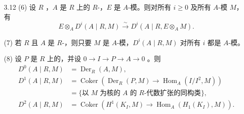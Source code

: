 \begin{SGAresult}{}{3.12}
(6) 设 $R$ ，$A$ 是 $R$ 上的 $R$-，$E$ 是 $A$-模。则对所有 $i\geq0$ 及所有 $A$-模 $M$，有
\[E\otimes_A D^i(A\mid R,M)\xrightarrow{\sim}D^i(A\mid R,E\otimes_A M).\]

(7) 若 $R$ 且 $A$ 是 $R$-，则只要 $M$ 是 $A$-模，$D^i(A\mid R,M)$ 对所有 $i$ 都是 $A$-模。

(8) 设 $P$ 是 $R$ 上的，并设 $0\to I\to P\to A\to0$ 。则
\[
\begin{aligned}
D^0(A\mid R,M)&=\operatorname{Der}_R(A,M),\\
D^1(A\mid R,M)&=\operatorname{Coker}(\operatorname{Der}_R(P,M)\to\operatorname{Hom}_A(I/I^2,M))\\
&=\{\text{以 }M\text{ 为核的 }A\text{ 的 }R\text{-代数扩张的同构类}\},\\
D^2(A\mid R,M)&=\operatorname{Coker}(H^1(K_I,M)\to\operatorname{Hom}_A(H_1(K_I),M)).
\end{aligned}
\]
\end{SGAresult}
